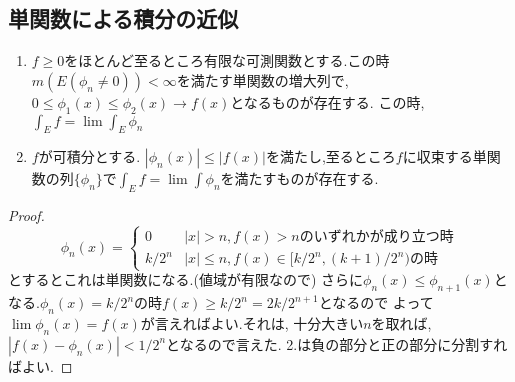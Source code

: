 \subsection{単関数による積分の近似}
\begin{lem}
\begin{enumerate}
    \item $f \ge 0$をほとんど至るところ有限な可測関数とする.この時$m(E(\phi_n \neq 0)) < \infty$を満たす単関数の増大列で,$0 \le \phi_1(x) \le \phi_2(x) \to f(x)$となるものが存在する.
    この時,$\int_E f = \lim \int_E \phi_n$
    \item $f$が可積分とする. $|\phi_n(x)| \le |f(x)|$を満たし,至るところ$f$に収束する単関数の列$\{ \phi_n \}$で$\int_E f = \lim \int \phi_n$を満たすものが存在する.
\end{enumerate}
\end{lem}
\begin{proof}
\begin{equation*}
    \phi_n(x) = \begin{cases}
    0  & |x| > n,  f(x) > n \mbox{のいずれかが成り立つ時} \\
    k/2^n &  |x| \le n, f(x) \in [k/2^n, (k+1)/2^n) \mbox{の時}
    \end{cases}
\end{equation*}
とするとこれは単関数になる.(値域が有限なので)
さらに$\phi_n(x) \le \phi_{n+1}(x)$となる.$\phi_n(x) = k/2^n$の時$f(x) \ge k/2^n = 2k/ 2^{n+1}$となるので
よって$\lim \phi_n(x) = f(x)$が言えればよい.それは,
十分大きい$n$を取れば,$|f(x) - \phi_n(x) | < 1/2^n$となるので言えた.
2.は負の部分と正の部分に分割すればよい.
\end{proof}

